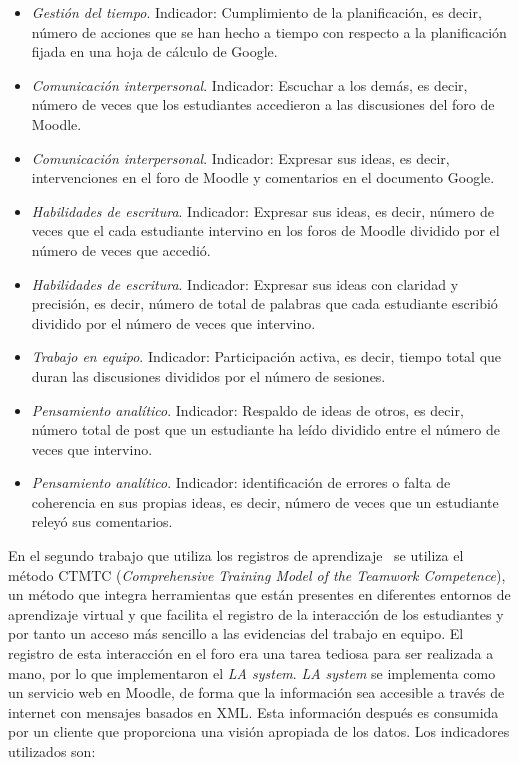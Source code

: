 \begin{itemize}
\item \emph{Gestión del tiempo}. Indicador: Cumplimiento de la planificación, es decir, número de acciones que se han hecho a tiempo con respecto a la planificación fijada en una hoja de cálculo de Google.
\item \emph{Comunicación interpersonal}. Indicador: Escuchar a los demás, es decir, número de veces que los estudiantes accedieron a las discusiones del foro de Moodle.
\item \emph{Comunicación interpersonal}. Indicador: Expresar sus ideas, es decir, intervenciones en el foro de Moodle y comentarios en el documento Google.
\item \emph{Habilidades de escritura}. Indicador: Expresar sus ideas, es decir, número de veces que el cada estudiante intervino en los foros de Moodle dividido por el número de veces que accedió.
\item \emph{Habilidades de escritura}. Indicador: Expresar sus ideas con claridad y precisión, es decir, número de total de palabras que cada estudiante escribió dividido por el número de veces que intervino.
\item \emph{Trabajo en equipo}. Indicador: Participación activa, es decir, tiempo total que duran las discusiones divididos por el número de sesiones.
\item \emph{Pensamiento analítico}. Indicador: Respaldo de ideas de otros, es decir, número total de post que un estudiante ha leído dividido entre el número de veces que intervino.
\item \emph{Pensamiento analítico}. Indicador: identificación de errores o falta de coherencia en sus propias ideas, es decir, número de veces que un estudiante releyó sus comentarios.
\end{itemize}

En el segundo trabajo que utiliza los registros de aprendizaje~\cite{fidalgo:2015} se utiliza el método CTMTC (\emph{Comprehensive Training Model of the Teamwork Competence}), un método que integra herramientas que están presentes en diferentes entornos de aprendizaje virtual y que facilita el registro de la interacción de los estudiantes y por tanto un acceso más sencillo a las evidencias del trabajo en equipo. El registro de esta interacción en el foro era una tarea tediosa para ser realizada a mano, por lo que implementaron el \emph{LA system}. \emph{LA system} se implementa como un servicio web en Moodle, de forma que la información sea accesible a través de internet con mensajes basados en XML. Esta información después es consumida por un cliente que proporciona una visión apropiada de los datos. Los indicadores utilizados son:

